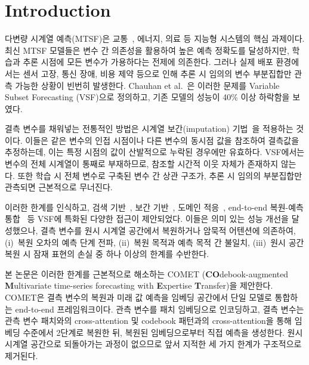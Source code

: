 
\section{Introduction}

다변량 시계열 예측(MTSF)은 교통~\cite{li2018dcrnn}, 에너지, 의료 등 지능형 시스템의 핵심 과제이다. 최신 MTSF 모델들은 변수 간 의존성을 활용하여 높은 예측 정확도를 달성하지만, 학습과 추론 시점에 모든 변수가 가용하다는 전제에 의존한다. 그러나 실제 배포 환경에서는 센서 고장, 통신 장애, 비용 제약 등으로 인해 추론 시 임의의 변수 부분집합만 관측 가능한 상황이 빈번히 발생한다. Chauhan et al.~\cite{chauhan2022vsf}은 이러한 문제를 Variable Subset Forecasting (VSF)으로 정의하고, 기존 모델의 성능이 40\% 이상 하락함을 보였다.


결측 변수를 채워넣는 전통적인 방법은 시계열 보간(imputation) 기법~\cite{tashiro2021csdi,du2023saits,cao2018brits}을 적용하는 것이다. 이들은 같은 변수의 인접 시점이나 다른 변수의 동시점 값을 참조하여 결측값을 추정하는데, 이는 특정 시점의 값이 산발적으로 누락된 경우에만 유효하다. VSF에서는 변수의 전체 시계열이 통째로 부재하므로, 참조할 시간적 이웃 자체가 존재하지 않는다. 또한 학습 시 전체 변수로 구축된 변수 간 상관 구조가, 추론 시 임의의 부분집합만 관측되면 근본적으로 무너진다.

이러한 한계를 인식하고, 검색 기반~\cite{chauhan2022vsf}, 보간 기반~\cite{gimcc2025,toivsf2024}, 도메인 적응~\cite{liang2025vida}, end-to-end 복원-예측 통합~\cite{yu2024ginar} 등 VSF에 특화된 다양한 접근이 제안되었다. 이들은 의미 있는 성능 개선을 달성했으나, 결측 변수를 원시 시계열 공간에서 복원하거나 암묵적 어텐션에 의존하여, (i)~복원 오차의 예측 단계 전파, (ii)~복원 목적과 예측 목적 간 불일치, (iii)~원시 공간 복원 시 잠재 표현의 손실 중 하나 이상의 한계를 수반한다.

본 논문은 이러한 한계를 근본적으로 해소하는 COMET (\textbf{CO}debook-augmented \textbf{M}ultivariate time-series forecasting with \textbf{E}xpertise \textbf{T}ransfer)을 제안한다. COMET은 결측 변수의 복원과 미래 값 예측을 임베딩 공간에서 단일 모델로 통합하는 end-to-end 프레임워크이다. 관측 변수를 패치 임베딩으로 인코딩하고, 결측 변수는 관측 변수 패치와의 cross-attention 및 codebook 패턴과의 cross-attention을 통해 임베딩 수준에서 2단계로 복원한 뒤, 복원된 임베딩으로부터 직접 예측을 생성한다. 원시 시계열 공간으로 되돌아가는 과정이 없으므로 앞서 지적한 세 가지 한계가 구조적으로 제거된다.

